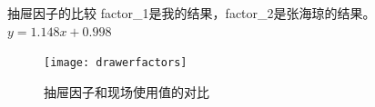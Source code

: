 \begin{frame}{抽屉因子的比较}
factor\_1是我的结果，factor\_2是张海琼的结果。$y=1.148x+0.998$
\vspace{-.05cm}
\begin{figure}
\texttt{[image: drawerfactors]}
\caption{抽屉因子和现场使用值的对比}
\end{figure}
\end{frame}

